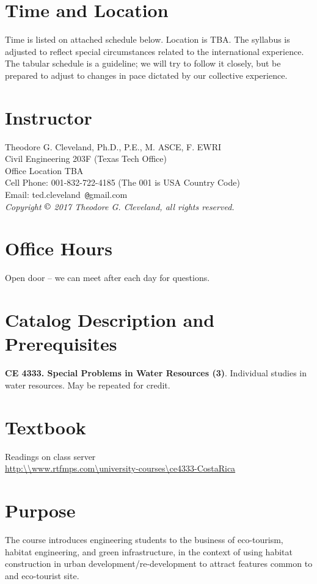 \documentclass[12pt]{article}
\begin{document}
\section*{ }
\section*{Time and Location}
Time is listed on attached schedule below.  
Location is TBA.
The syllabus is adjusted to reflect special circumstances related to the international experience.   
The tabular schedule is a guideline; we will try to follow it closely, but be prepared to adjust to changes in pace dictated by our collective experience.
\section*{Instructor}
Theodore G. Cleveland, Ph.D., P.E., M. ASCE, F. EWRI\\
Civil Engineering 203F (Texas Tech Office)\\
Office Location TBA \\
Cell Phone: 001-832-722-4185  (The 001 is USA Country Code)\\
Email: ted.cleveland~\texttt{@}gmail.com\\
\textsl{Copyright $\copyright$ 2017 Theodore G. Cleveland, all rights reserved.} 
\section*{Office Hours}
Open door -- we can meet after each day for questions.
\section*{Catalog Description and Prerequisites}
\textbf{CE 4333. Special Problems in Water Resources (3)}. Individual studies in water resources. May be repeated for credit.
\section*{Textbook}
Readings on class server \\ \url{http:\\www.rtfmps.com\university-courses\ce4333-CostaRica}
\section*{Purpose}
The course introduces engineering students to the business of eco-tourism, habitat engineering, and green infrastructure, in the context of using habitat construction in urban development/re-development to attract features common to and eco-tourist site.
\end{document}
